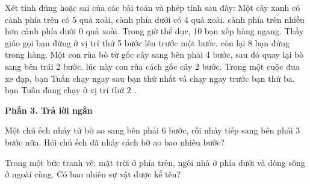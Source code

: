 \begin{ex} %
Xét tính đúng hoặc sai của các bài toán và phép tính sau đây:
\choiceTF
{Một cây xanh có cành phía trên có 5 quả xoài, cành phía dưới có 4 quả xoài. cành phía trên nhiều hơn cành phía dưới $0$ quả xoài.}
{Trong giờ thể dục, 10 bạn xếp hàng ngang. Thầy giáo gọi bạn đứng ở vị trí thứ 5 bước lên trước một bước. còn lại $8$ bạn đứng trong hàng.}
{\True Một con rùa bò từ gốc cây sang bên phải 4 bước, sau đó quay lại bò sang bên trái 2 bước. lúc này con rùa cách gốc cây $2$ bước.}
{\True Trong một cuộc đua xe đạp, bạn Tuấn chạy ngay sau bạn thứ nhất và chạy ngay trước bạn thứ ba. bạn Tuấn đang chạy ở vị trí thứ $2$ .}
\end{ex}

\textbf{Phần 3. Trả lời ngắn}

\begin{ex} %
Một chú ếch nhảy từ bờ ao sang bên phải 6 bước, rồi nhảy tiếp sang bên phải 3 bước nữa. Hỏi chú ếch đã nhảy cách bờ ao bao nhiêu bước?
\end{ex}

\begin{ex} %
Trong một bức tranh vẽ: mặt trời ở phía trên, ngôi nhà ở phía dưới và dòng sông ở ngoài cùng. Có bao nhiêu sự vật được kể tên?
\end{ex}

